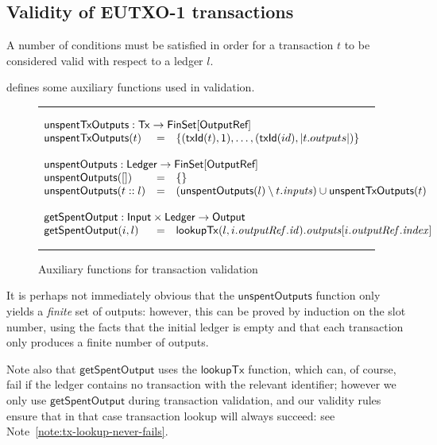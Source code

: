 \documentclass[a4paper]{article}
\newcounter{note}
\newcommand{\s}{\textsf}  %
\newcommand{\msf}[1]{\ensuremath{\mathsf{#1}}}
\newcommand{\mi}[1]{\ensuremath{\mathit{#1}}}
\newcommand\rfskip{7pt}
\newenvironment{ruledfigure}[1]{\begin{figure}[#1]\hrule\vspace{\rfskip}}{\vspace{\rfskip}\hrule\end{figure}}
\newcommand{\FinSet}[1]{\ensuremath{\s{FinSet}[#1]}}
\newcommand{\txId}{\msf{txId}}
\newcommand{\idx}{\mi{index}}
\newcommand{\inputs}{\mi{inputs}}
\newcommand{\outputs}{\mi{outputs}}
\newcommand{\outputref}{\mi{outputRef}}
\newcommand{\id}{\mi{id}}
\newcommand{\lookupTx}{\msf{lookupTx}}
\newcommand{\getSpent}{\msf{getSpentOutput}}
\newcommand{\unspent}{\msf{unspentOutputs}}
\newcommand{\txunspent}{\msf{unspentTxOutputs}}
\newcommand{\eutxotx}{\msf{Tx}}
\newcommand{\emptymap}{\ensuremath{\{\}}}
\begin{document}
\subsection{Validity of EUTXO-1 transactions}
\label{sec:eutxo-1-validity}
A number of conditions must be satisfied in order for a transaction
$t$ to be considered valid with respect to a ledger $l$.

 defines some auxiliary functions used in validation.
\begin{ruledfigure}{H}
  \begin{displaymath}
  \begin{array}{lll}
  \multicolumn{3}{l}{\txunspent : \eutxotx \rightarrow \FinSet{\s{OutputRef}}}\\
  \txunspent(t) &=& \{(\txId(t),1), \ldots, (\txId(id),\left|t.outputs\right|)\}\\
  \\
  \multicolumn{3}{l}{\unspent : \s{Ledger} \rightarrow \FinSet{\s{OutputRef}}}\\
  \unspent([]) &=& \emptymap \\
  \unspent(t::l) &=& (\unspent(l) \setminus t.\inputs) \cup \txunspent(t)\\
  \\
  \multicolumn{3}{l}{\getSpent : \s{Input} \times \s{Ledger} \rightarrow \s{Output}}\\
  \getSpent(i,l) &=& \lookupTx (l, i.\outputref.\id).\outputs[i.\outputref.\idx]
  \end{array}
  \end{displaymath}
  \caption{Auxiliary functions for transaction validation}
  \label{fig:validation-functions-1}
\end{ruledfigure}

It is perhaps not immediately obvious that the $\unspent$ function
only yields a \textit{finite} set of outputs: however, this can be
proved by induction on the slot number, using the facts that the
initial ledger is empty and that each transaction only produces a
finite number of outputs.

Note also that $\getSpent$ uses the $\lookupTx$ function, which can, of
course, fail if the ledger contains no transaction with the relevant
identifier; however we only use $\getSpent$ during transaction
validation, and our validity rules ensure that in that case
transaction lookup will always succeed: see Note~\ref{note:tx-lookup-never-fails}.

\medskip
\end{document}
